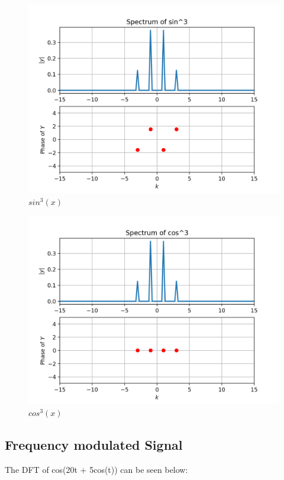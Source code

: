 \documentclass[11pt, a4paper]{article}
\begin{document}
\begin{figure}[!tbh]
   	\centering
   	\includegraphics[scale=0.7]{sin3.png}   
   	\caption{$sin^3(x)$}
   	\label{fig:Figure_1}
\end{figure}
\begin{figure}[!tbh]
   	\centering
   	\includegraphics[scale=0.7]{cos3.png}   
   	\caption{$cos^3(x)$}
   	\label{fig:Figure_1}
\end{figure}

\subsection{Frequency modulated Signal}
The DFT of cos(20t + 5cos(t)) can be seen below:
\end{document}
